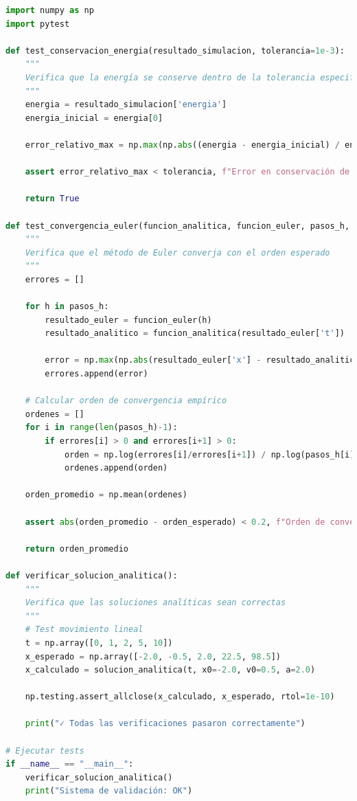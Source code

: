 \documentclass{article}
\begin{document}
\begin{lstlisting}[language=Python, caption={Funciones de validación para verificar implementaciones}]
import numpy as np
import pytest

def test_conservacion_energia(resultado_simulacion, tolerancia=1e-3):
    """
    Verifica que la energía se conserve dentro de la tolerancia especificada
    """
    energia = resultado_simulacion['energia']
    energia_inicial = energia[0]
    
    error_relativo_max = np.max(np.abs((energia - energia_inicial) / energia_inicial))
    
    assert error_relativo_max < tolerancia, f"Error en conservación de energía: {error_relativo_max:.2e}"
    
    return True

def test_convergencia_euler(funcion_analitica, funcion_euler, pasos_h, orden_esperado=1):
    """
    Verifica que el método de Euler converja con el orden esperado
    """
    errores = []
    
    for h in pasos_h:
        resultado_euler = funcion_euler(h)
        resultado_analitico = funcion_analitica(resultado_euler['t'])
        
        error = np.max(np.abs(resultado_euler['x'] - resultado_analitico))
        errores.append(error)
    
    # Calcular orden de convergencia empírico
    ordenes = []
    for i in range(len(pasos_h)-1):
        if errores[i] > 0 and errores[i+1] > 0:
            orden = np.log(errores[i]/errores[i+1]) / np.log(pasos_h[i]/pasos_h[i+1])
            ordenes.append(orden)
    
    orden_promedio = np.mean(ordenes)
    
    assert abs(orden_promedio - orden_esperado) < 0.2, f"Orden de convergencia incorrecto: {orden_promedio:.2f}"
    
    return orden_promedio

def verificar_solucion_analitica():
    """
    Verifica que las soluciones analíticas sean correctas
    """
    # Test movimiento lineal
    t = np.array([0, 1, 2, 5, 10])
    x_esperado = np.array([-2.0, -0.5, 2.0, 22.5, 98.5])
    x_calculado = solucion_analitica(t, x0=-2.0, v0=0.5, a=2.0)
    
    np.testing.assert_allclose(x_calculado, x_esperado, rtol=1e-10)
    
    print("✓ Todas las verificaciones pasaron correctamente")

# Ejecutar tests
if __name__ == "__main__":
    verificar_solucion_analitica()
    print("Sistema de validación: OK")
\end{lstlisting}
\end{document}
